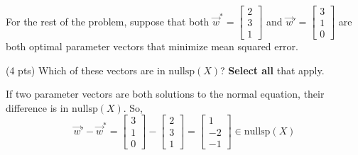 \documentclass[11pt]{article}
\begin{document}
\begin{prob}[(19 pts)]
For the rest of the problem, suppose that both $\vec w^* = \begin{bmatrix} 2 \\ 3 \\ 1 \end{bmatrix}$ and $\vec w' = \begin{bmatrix} 3 \\ 1 \\ 0 \end{bmatrix}$ are both optimal parameter vectors that minimize mean squared error.

\begin{subprob}(4 pts)
Which of these vectors are in $\text{nullsp}(X)$? \textbf{Select all} that apply. \\

 \quad {} \quad {} \quad {} \quad {} 

\begin{solution}
If two parameter vectors are both solutions to the normal equation, their difference is in $\text{nullsp}(X)$. So,
\[
\vec w' - \vec w^*
=
\begin{bmatrix} 3 \\ 1 \\ 0 \end{bmatrix}
-
\begin{bmatrix} 2 \\ 3 \\ 1 \end{bmatrix}
=
\begin{bmatrix} 1 \\ -2 \\ -1 \end{bmatrix}
\in \text{nullsp}(X)
\]


\end{solution}
\end{subprob}
\end{prob}
\end{document}
